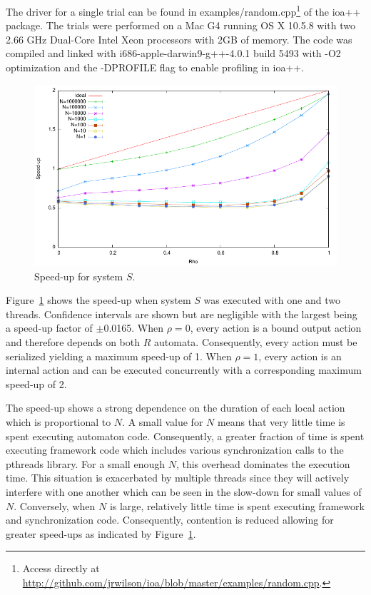 The driver for a single trial can be found in examples/random.cpp\footnote{Access directly at \url{http://github.com/jrwilson/ioa/blob/master/examples/random.cpp}.} of the ioa++ package.
The trials were performed on a Mac G4 running OS X 10.5.8 with two 2.66 GHz Dual-Core Intel Xeon processors with 2GB of memory.
The code was compiled and linked with i686-apple-darwin9-g++-4.0.1 build 5493 with -O2 optimization and the -DPROFILE flag to enable profiling in ioa++.

\begin{figure}
\center
\includegraphics[width=\columnwidth]{speed_up}
\caption{Speed-up for system $S$.\label{speed_up}}
\end{figure}

Figure~\ref{speed_up} shows the speed-up when system $S$ was executed with one and two threads.
Confidence intervals are shown but are negligible with the largest being a speed-up factor of $\pm$0.0165.
When $\rho = 0$, every action is a bound output action and therefore depends on both $R$ automata.
Consequently, every action must be serialized yielding a maximum speed-up of 1.
When $\rho = 1$, every action is an internal action and can be executed concurrently with a corresponding maximum speed-up of 2.

The speed-up shows a strong dependence on the duration of each local action which is proportional to $N$.
A small value for $N$ means that very little time is spent executing automaton code.
Consequently, a greater fraction of time is spent executing framework code which includes various synchronization calls to the pthreads library.
For a small enough $N$, this overhead dominates the execution time.
This situation is exacerbated by multiple threads since they will actively interfere with one another which can be seen in the slow-down for small values of $N$.
Conversely, when $N$ is large, relatively little time is spent executing framework and synchronization code.
Consequently, contention is reduced allowing for greater speed-ups as indicated by Figure~\ref{speed_up}.

